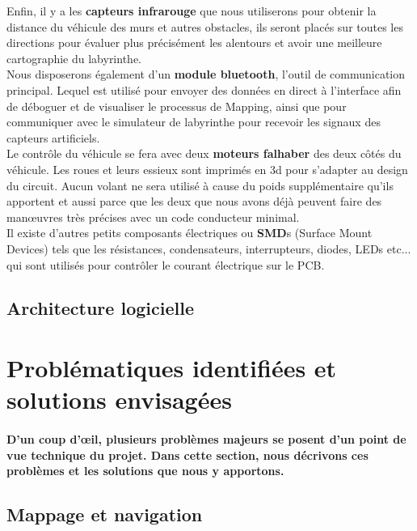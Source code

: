    Enfin, il y a les \textbf{capteurs infrarouge} que nous utiliserons pour
obtenir la distance du véhicule des murs et autres obstacles, ils seront
placés sur toutes les directions pour évaluer plus précisément les alentours
et avoir une meilleure cartographie du labyrinthe. \\


   Nous disposerons également d'un \textbf{module bluetooth}, l'outil de
communication principal.  Lequel est utilisé pour envoyer des données en
direct à l'interface afin de déboguer et de visualiser le processus de
Mapping, ainsi que pour communiquer avec le simulateur de labyrinthe pour
recevoir les signaux des capteurs artificiels. \\


   Le contrôle du véhicule se fera avec deux \textbf{moteurs falhaber}
\cite{faulhaber:1} des deux côtés du véhicule. Les roues et leurs essieux sont
imprimés en 3d pour s'adapter au design du circuit. Aucun volant ne sera
utilisé à cause du poids supplémentaire qu'ils apportent et aussi parce que
les deux que nous avons déjà peuvent faire des manœuvres très précises avec un
code conducteur minimal. \\


   Il existe d'autres petits composants électriques ou \textbf{SMD}s (Surface
Mount Devices) tels que les résistances, condensateurs, interrupteurs,
diodes, LEDs etc... qui sont utilisés pour contrôler le courant électrique
sur le PCB.

\subsection{Architecture logicielle} \label{sec:vueLogicielle}



\section{Problématiques identifiées et solutions envisagées} \label{sec:problemesSolutions}

\paragraph{
   D'un coup d'œil, plusieurs problèmes majeurs se posent d'un point de vue
technique du projet.  Dans cette section, nous décrivons ces problèmes et
les solutions que nous y apportons.}



\subsection{Mappage et navigation} \label{sec:rechChem} 

